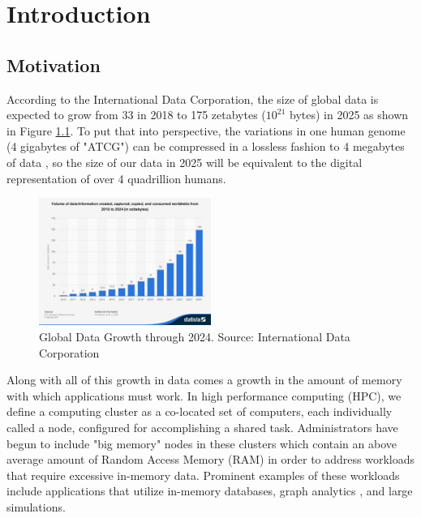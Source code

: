 \chapter{Introduction} \label{introduction}

\section{Motivation}
According to the International Data Corporation, the size of global data is expected to grow from 33 in 2018 to 175 zetabytes ($10^21$ bytes) in 2025 as shown in Figure \ref{fig:data_growth}. \cite{IDS} To put that into perspective, the variations in one human genome (4 gigabytes of "ATCG") can be compressed in a lossless fashion to 4 megabytes of data \cite{genome_size}, so the size of our data in 2025 will be equivalent to the digital representation of over 4 quadrillion humans. 

\begin{figure}[h]
\centering
\includegraphics[width=0.5\textwidth]{Figures/global_data_growth.jpg}
\caption{Global Data Growth through 2024. Source: International Data Corporation}
\label{fig:data_growth}
\end{figure}

Along with all of this growth in data comes a growth in the amount of memory with which applications must work. In high performance computing (HPC), we define a computing cluster as a co-located set of computers, each individually called a node, configured for accomplishing a shared task.  Administrators have begun to include "big memory" nodes in these clusters which contain an above average amount of Random Access Memory (RAM) in order to address workloads that require excessive in-memory data. Prominent examples of these workloads include applications that utilize in-memory databases, graph analytics \cite{virtual_memory_tlb}, and large simulations. 

